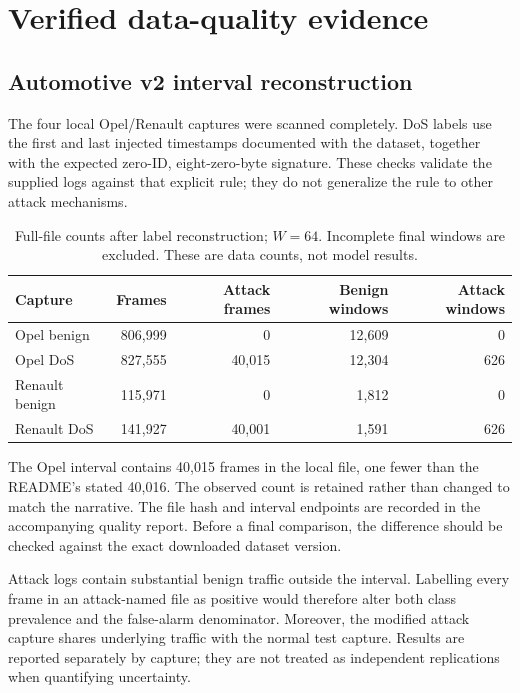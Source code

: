 \documentclass[12pt,a4paper,oneside,openany]{extbook}
\begin{document}
\section{Verified data-quality evidence}
\subsection{Automotive v2 interval reconstruction}
The four local Opel/Renault captures were scanned completely. DoS labels use the first and last injected timestamps documented with the dataset, together with the expected zero-ID, eight-zero-byte signature. These checks validate the supplied logs against that explicit rule; they do not generalize the rule to other attack mechanisms.

\begin{table}[htbp]\centering\small
\caption{Full-file counts after label reconstruction; $W=64$. Incomplete final windows are excluded. These are data counts, not model results.}\label{tab:quality}
\begin{tabular}{lrrrr}\toprule
Capture & Frames & Attack frames & Benign windows & Attack windows\\\midrule

Opel benign & 806,999 & 0 & 12,609 & 0 \\
Opel DoS & 827,555 & 40,015 & 12,304 & 626 \\
Renault benign & 115,971 & 0 & 1,812 & 0 \\
Renault DoS & 141,927 & 40,001 & 1,591 & 626 \\
\bottomrule
\end{tabular}
\end{table}

The Opel interval contains 40,015 frames in the local file, one fewer than the README's stated 40,016. The observed count is retained rather than changed to match the narrative. The file hash and interval endpoints are recorded in the accompanying quality report. Before a final comparison, the difference should be checked against the exact downloaded dataset version.

Attack logs contain substantial benign traffic outside the interval. Labelling every frame in an attack-named file as positive would therefore alter both class prevalence and the false-alarm denominator. Moreover, the modified attack capture shares underlying traffic with the normal test capture. Results are reported separately by capture; they are not treated as independent replications when quantifying uncertainty.
\end{document}
